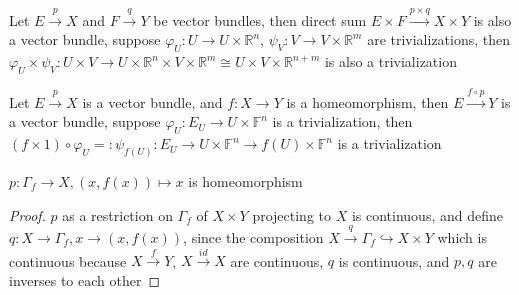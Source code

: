 \documentclass[main]{subfiles}
\begin{document}
\begin{definition}
Let $E\overset{p}{\to}X$ and $F\overset{q}{\to}Y$ be vector bundles, then direct sum $E\times F\overset{p\times q}{\to}X\times Y$ is also a vector bundle, suppose $\varphi_U:U\to U\times\mathbb R^n$, $\psi_V:V\to V\times\mathbb R^m$ are trivializations, then $\varphi_U\times\psi_V:U\times V\to U\times\mathbb R^n\times V\times\mathbb R^m\cong U\times V\times\mathbb R^{n+m}$ is also a trivialization
\end{definition}

\begin{proposition}
Let $E\overset{p}{\to} X$ is a vector bundle, and $f:X\to Y$ is a homeomorphism, then $E\xrightarrow{f\circ p}Y$ is a vector bundle, suppose $\varphi_U:E_U\to U\times\mathbb F^n$ is a trivialization, then $(f\times 1)\circ\varphi_U=:\psi_{f(U)}:E_U\to U\times\mathbb F^n\to f(U)\times\mathbb F^n$ is a trivialization
\end{proposition}

\begin{proposition}\label{Domain is homeomorphic to its graph}
$p:\Gamma_f\to X, (x,f(x))\mapsto x$ is homeomorphism
\end{proposition}

\begin{proof}
$p$ as a restriction on $\Gamma_f$ of $X\times Y$ projecting to $X$ is continuous, and define $q:X\to \Gamma_f, x\to (x,f(x))$, since the composition $X\overset{q}{\to}\Gamma_f\hookrightarrow X\times Y$ which is continuous because $X\overset{f}{\to} Y$, $X\overset{id}{\to} X$ are continuous, $q$ is continuous, and $p,q$ are inverses to each other
\end{proof}
\end{document}
